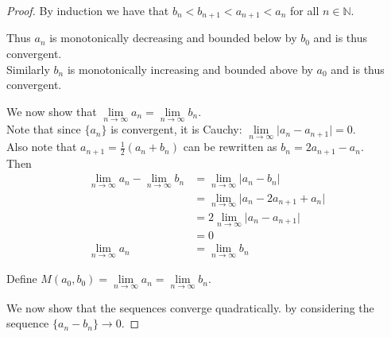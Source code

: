 \documentclass[12pt]{article}
\begin{document}
\begin{proof}
		\bigbreak
		
		By induction we have that $b_{n}<b_{n+1}<a_{n+1} < a_{n}$ for all $n \in \mathbb{N}$. \bigbreak
		
		Thus ${a_n}$ is monotonically decreasing and bounded below by $b_0$ and is thus convergent. \\
		Similarly ${b_n}$ is monotonically increasing and bounded above by $a_0$ and is thus convergent. \bigbreak
		
		We now show that $\lim\limits_{n \to \infty}a_n = \lim\limits_{n \to \infty}b_n$. \\
		Note that since $\{a_n\}$ is convergent, it is Cauchy: $\lim\limits_{n \to \infty}\vert a_n - a_{n+1} \vert = 0$. \\
		Also note that $a_{n+1} = \frac{1}{2}(a_n + b_n)$ can be rewritten as $b_n = 2a_{n+1} - a_{n}$. \\
		Then \\
		\begin{align*}
			\lim\limits_{n \to \infty} a_n - \lim\limits_{n \to \infty} b_n  &= \lim\limits_{n \to \infty}\vert a_n - b_n \vert  \\
			& = \lim\limits_{n \to \infty} \vert a_n - 2a_{n+1} + a_{n} \vert  \\
			& = 2\lim\limits_{n \to \infty} \vert a_n - a_{n+1} \vert \\
			& = 0 \\
			\lim\limits_{n \to \infty} a_n & = \lim\limits_{n \to \infty} b_n
		\end{align*}
		
		Define $M(a_{0}, b_{0}) = \lim\limits_{n \to \infty} a_n = \lim\limits_{n \to \infty} b_n$. \bigbreak
		
		We now show that the sequences converge quadratically. by considering the sequence $\{a_n-b_n\} \to 0$. \bigbreak
		

\end{proof}
\end{document}

